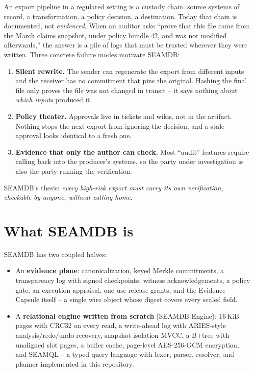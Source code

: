 \documentclass[11pt]{article}
\begin{document}
An export pipeline in a regulated setting is a custody chain: source systems
of record, a transformation, a policy decision, a destination. Today that
chain is documented, not \emph{evidenced}. When an auditor asks ``prove that
this file came from the March claims snapshot, under policy bundle 42, and was
not modified afterwards,'' the answer is a pile of logs that must be trusted
wherever they were written. Three concrete failure modes motivate SEAMDB:

\begin{enumerate}
  \item \textbf{Silent rewrite.} The sender can regenerate the export from
    different inputs and the receiver has no commitment that pins the
    original. Hashing the final file only proves the file was not changed in
    transit -- it says nothing about \emph{which inputs} produced it.
  \item \textbf{Policy theater.} Approvals live in tickets and wikis, not in
    the artifact. Nothing stops the next export from ignoring the decision,
    and a stale approval looks identical to a fresh one.
  \item \textbf{Evidence that only the author can check.} Most ``audit''
    features require calling back into the producer's systems, so the party
    under investigation is also the party running the verification.
\end{enumerate}

SEAMDB's thesis: \emph{every high-risk export must carry its own
verification, checkable by anyone, without calling home.}

\section{What SEAMDB is}
\label{sec:what}

SEAMDB has two coupled halves:

\begin{itemize}
  \item An \textbf{evidence plane}: canonicalization, keyed Merkle
    commitments, a transparency log with signed checkpoints, witness
    acknowledgements, a policy gate, an execution appraisal, one-use release
    grants, and the Evidence Capsule itself -- a single wire object whose
    digest covers every sealed field.
  \item A \textbf{relational engine written from scratch} (SEAMDB Engine):
    16\,KiB pages with CRC32 on every read, a write-ahead log with
    ARIES-style analysis/redo/undo recovery, snapshot-isolation MVCC, a
    B$+$tree with unaligned slot pages, a buffer cache, page-level
    AES-256-GCM encryption, and SEAMQL -- a typed query language with
    lexer, parser, resolver, and planner implemented in this repository.
\end{itemize}
\end{document}
